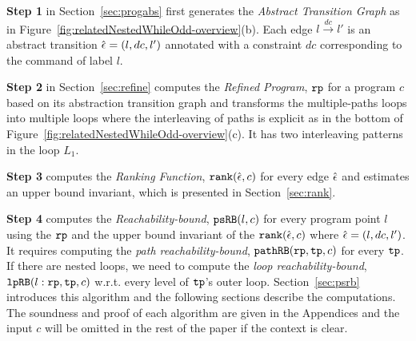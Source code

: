 
\textbf{Step 1}
in Section~\ref{sec:progabs} first 
generates the \emph{Abstract Transition Graph} as in Figure~\ref{fig:relatedNestedWhileOdd-overview}(b).
Each edge $l \xrightarrow{dc} l'$ is an abstract transition $\hat{\mathtt{\epsilon}{}} = (l, dc, l')$ annotated with a constraint $dc$ corresponding to the command of label $l$.

\textbf{Step 2} in Section~\ref{sec:refine}
computes the \emph{Refined Program}, $\mathtt{rp}$ for a program $c$ based on 
its abstraction transition graph and transforms the multiple-paths loops
into multiple loops where
the interleaving of paths is explicit as in the bottom of Figure~\ref{fig:relatedNestedWhileOdd-overview}(c).
It has two interleaving patterns in the loop $L_1$.

\textbf{Step 3} computes the \emph{Ranking Function}, $\mathtt{rank}(\hat{\mathtt{\epsilon}{}}, c)$ 
for every edge $\hat{\mathtt{\epsilon}{}}$ 
and estimates an upper bound invariant, which is presented in Section~\ref{sec:rank}.

\textbf{Step 4}
computes the \emph{Reachability-bound}, $\mathtt{psRB}(l, c)$ for every program point $l$ using the $\mathtt{rp}$ and the upper bound invariant of the $\mathtt{rank}(\hat{\mathtt{\epsilon}{}}, c)$ where $\hat{\mathtt{\epsilon}{}} = (l,dc,l')$.
{It requires computing the \emph{path reachability-bound}, $\mathtt{pathRB}(\mathtt{rp}, \mathtt{tp}, c)$ for every $\mathtt{tp}$.
If there are nested loops, we need to compute the \emph{loop reachability-bound}, $\mathtt{lpRB}(l: \mathtt{rp}, \mathtt{tp}, c)$ w.r.t. every level of $\mathtt{tp}$'s outer loop. }
Section~\ref{sec:psrb} introduces this algorithm and the following sections describe the computations. 
The soundness and proof of each algorithm are given in the Appendices and the input $c$ will be omitted in the rest of the paper if the context is clear.

